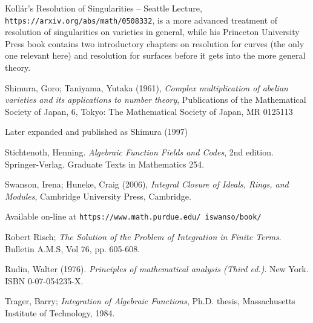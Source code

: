 \begin{thebibliography}{9}
Kollár's Resolution of Singularities -- Seattle Lecture, {\tt https://arxiv.org/abs/math/0508332},
is a more advanced treatment of resolution of singularities on varieties in general, while
his Princeton University Press book contains two introductory chapters on resolution for curves
(the only one relevant here) and resolution for surfaces before it gets into the more general theory.

Shimura, Goro; Taniyama, Yutaka (1961), {\it Complex multiplication of abelian varieties and its applications to number theory},
Publications of the Mathematical Society of Japan, 6, Tokyo: The Mathematical Society of Japan, MR 0125113

Later expanded and published as Shimura (1997)

Stichtenoth, Henning.  {\it Algebraic Function Fields and Codes}, 2nd edition.
Springer-Verlag.  Graduate Texts in Mathematics 254.

Swanson, Irena; Huneke, Craig (2006), {\it Integral Closure of Ideals, Rings, and Modules},
Cambridge University Press, Cambridge.

Available on-line at {\tt https://www.math.purdue.edu/~iswanso/book/}

Robert Risch; {\it The Solution of the Problem of Integration in Finite Terms}.  Bulletin A.M.S, Vol 76, pp. 605-608.

Rudin, Walter (1976). {\it Principles of mathematical analysis (Third ed.)}. New York. ISBN 0-07-054235-X.

Trager, Barry; {\it Integration of Algebraic Functions}, Ph.D. thesis, Massachusetts Institute of Technology, 1984.


\end{thebibliography}
